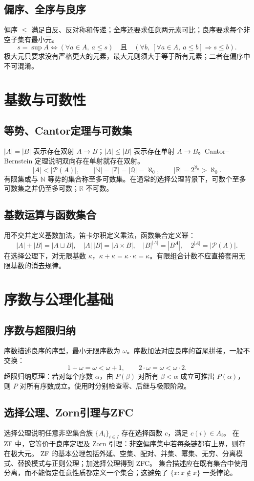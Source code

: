 \documentclass[../main.tex]{subfiles}
\begin{document}
\subsection{偏序、全序与良序}
偏序 $\le$ 满足自反、反对称和传递；全序还要求任意两元素可比；良序要求每个非空子集有最小元。
\[
s=\sup A\iff (\forall a\in A,\ a\le s)\quad\text{且}\quad
(\forall b,\ [\forall a\in A,\ a\le b]\Rightarrow s\le b).
\]
极大元只要求没有严格更大的元素，最大元则须大于等于所有元素；二者在偏序中不可混淆。
\section{基数与可数性}
\subsection{等势、Cantor定理与可数集}
$|A|=|B|$ 表示存在双射 $A\to B$；$|A|\le|B|$ 表示存在单射 $A\to B$。Cantor--Bernstein 定理说明双向存在单射就存在双射。
\[
|A|<|\mathcal P(A)|,\qquad
|\mathbb N|=|\mathbb Z|=|\mathbb Q|=\aleph_0,\qquad
|\mathbb R|=2^{\aleph_0}>\aleph_0.
\]
有限集或与 $\mathbb N$ 等势的集合称至多可数集。在通常的选择公理背景下，可数个至多可数集之并仍至多可数；$\mathbb R$ 不可数。
\subsection{基数运算与函数集合}
用不交并定义基数加法，笛卡尔积定义乘法，函数集合定义幂：
\[
|A|+|B|=|A\sqcup B|,\quad |A|\,|B|=|A\times B|,\quad
|B|^{|A|}=|B^A|,\quad 2^{|A|}=|\mathcal P(A)|.
\]
在选择公理下，对无限基数 $\kappa$，$\kappa+\kappa=\kappa\cdot\kappa=\kappa$。有限组合计数不应直接套用无限基数的消去规律。
\section{序数与公理化基础}
\subsection{序数与超限归纳}
序数描述良序的序型，最小无限序数为 $\omega$。序数加法对应良序的首尾拼接，一般不交换：
\[
1+\omega=\omega<\omega+1,\qquad 2\cdot\omega=\omega<\omega\cdot2.
\]
超限归纳原理：若对每个序数 $\alpha$，由 $P(\beta)$ 对所有 $\beta<\alpha$ 成立可推出 $P(\alpha)$，则 $P$ 对所有序数成立。使用时分别检查零、后继与极限阶段。
\subsection{选择公理、Zorn引理与ZFC}
选择公理说明任意非空集合族 $\{A_i\}_{i\in I}$ 存在选择函数 $c$，满足 $c(i)\in A_i$。
在 ZF 中，它等价于良序定理及 Zorn 引理：非空偏序集中若每条链都有上界，则存在极大元。
ZF 的基本公理包括外延、空集、配对、并集、幂集、无穷、分离模式、替换模式与正则公理；加选择公理得到 ZFC。
集合描述应在既有集合中使用分离，而不能假定任意性质都定义一个集合；这避免了 $\{x:x\notin x\}$ 一类悖论。
\end{document}
